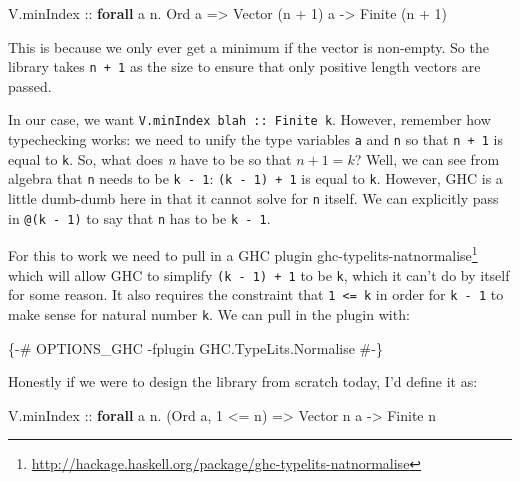 \documentclass[]{article}
\newenvironment{Shaded}{}{}
\newcommand{\DataTypeTok}[1]{\textcolor[rgb]{0.56,0.13,0.00}{#1}}
\newcommand{\DecValTok}[1]{\textcolor[rgb]{0.25,0.63,0.44}{#1}}
\newcommand{\KeywordTok}[1]{\textcolor[rgb]{0.00,0.44,0.13}{\textbf{#1}}}
\newcommand{\NormalTok}[1]{#1}
\newcommand{\OperatorTok}[1]{\textcolor[rgb]{0.40,0.40,0.40}{#1}}
\newcommand{\OtherTok}[1]{\textcolor[rgb]{0.00,0.44,0.13}{#1}}
\renewcommand{\href}[2]{#2\footnote{\url{#1}}}
\begin{document}
\begin{Shaded}
\begin{Highlighting}[]
\NormalTok{V.minIndex}\OtherTok{ ::} \KeywordTok{forall}\NormalTok{ a n}\OperatorTok{.} \DataTypeTok{Ord}\NormalTok{ a }\OtherTok{=\textgreater{}} \DataTypeTok{Vector}\NormalTok{ (n }\OperatorTok{+} \DecValTok{1}\NormalTok{) a }\OtherTok{{-}\textgreater{}} \DataTypeTok{Finite}\NormalTok{ (n }\OperatorTok{+} \DecValTok{1}\NormalTok{)}
\end{Highlighting}
\end{Shaded}

This is because we only ever get a minimum if the vector is non-empty. So the
library takes \texttt{n\ +\ 1} as the size to ensure that only positive length
vectors are passed.

In our case, we want \texttt{V.minIndex\ blah\ ::\ Finite\ k}. However, remember
how typechecking works: we need to unify the type variables \texttt{a} and
\texttt{n} so that \texttt{n\ +\ 1} is equal to \texttt{k}. So, what does
\emph{n} have to be so that \(n + 1 = k\)? Well, we can see from algebra that
\texttt{n} needs to be \texttt{k\ -\ 1}: \texttt{(k\ -\ 1)\ +\ 1} is equal to
\texttt{k}. However, GHC is a little dumb-dumb here in that it cannot solve for
\texttt{n} itself. We can explicitly pass in \texttt{@(k\ -\ 1)} to say that
\texttt{n} has to be \texttt{k\ -\ 1}.

For this to work we need to pull in a GHC plugin
\href{http://hackage.haskell.org/package/ghc-typelits-natnormalise}{ghc-typelits-natnormalise}
which will allow GHC to simplify \texttt{(k\ -\ 1)\ +\ 1} to be \texttt{k},
which it can't do by itself for some reason. It also requires the constraint
that \texttt{1\ \textless{}=\ k} in order for \texttt{k\ -\ 1} to make sense for
natural number \texttt{k}. We can pull in the plugin with:

\begin{Shaded}
\begin{Highlighting}[]
\OtherTok{\{{-}\# OPTIONS\_GHC {-}fplugin GHC.TypeLits.Normalise \#{-}\}}
\end{Highlighting}
\end{Shaded}

Honestly if we were to design the library from scratch today, I'd define it as:

\begin{Shaded}
\begin{Highlighting}[]
\NormalTok{V.minIndex}\OtherTok{ ::} \KeywordTok{forall}\NormalTok{ a n}\OperatorTok{.}\NormalTok{ (}\DataTypeTok{Ord}\NormalTok{ a, }\DecValTok{1} \OperatorTok{\textless{}=}\NormalTok{ n) }\OtherTok{=\textgreater{}} \DataTypeTok{Vector}\NormalTok{ n a }\OtherTok{{-}\textgreater{}} \DataTypeTok{Finite}\NormalTok{ n}
\end{Highlighting}
\end{Shaded}
\end{document}
